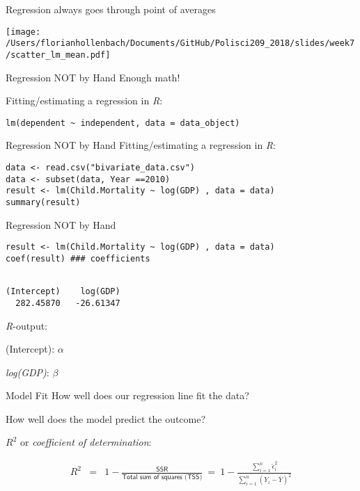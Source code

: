 \documentclass[presentation]{beamer}
\begin{document}
\begin{frame}[label={sec:orgdab9fa3}]{Regression always goes through point of averages}
\begin{center}
\texttt{[image: /Users/florianhollenbach/Documents/GitHub/Polisci209\_2018/slides/week7/scatter\_lm\_mean.pdf]}
\end{center}
\end{frame}


\begin{frame}[fragile,label={sec:org4e9f428}]{Regression NOT by Hand}
 \alert{Enough math!}

Fitting/estimating a regression in \emph{R}:

\begin{verbatim}
lm(dependent ~ independent, data = data_object)
\end{verbatim}
\end{frame}


\begin{frame}[fragile,label={sec:org700a1ad}]{Regression NOT by Hand}
 \alert{Fitting/estimating a regression in \emph{R}:}

\begin{verbatim}
data <- read.csv("bivariate_data.csv")
data <- subset(data, Year ==2010)
result <- lm(Child.Mortality ~ log(GDP) , data = data)
summary(result)
\end{verbatim}
\end{frame}


\begin{frame}[fragile,label={sec:org93b4a79}]{Regression NOT by Hand}
 \begin{verbatim}
result <- lm(Child.Mortality ~ log(GDP) , data = data)
coef(result) ### coefficients
\end{verbatim}

\begin{verbatim}

(Intercept)    log(GDP) 
  282.45870   -26.61347
\end{verbatim}

\emph{R}-output:

(Intercept): \(\alpha\)

\emph{log(GDP)}: \(\beta\)
\end{frame}

\begin{frame}[label={sec:org8d84d55}]{Model Fit}
How well does our regression line fit the data?

How well does the model predict the outcome?

\pause

\(R^{2}\) or \emph{coefficient of determination}:

\begin{eqnarray*}
      R^2 & = & 1 - \frac{\textsf{SSR}}{\textsf{Total sum of squares (TSS)}}  \ = \ 1 - \frac{\sum_{i=1}^n \hat\epsilon_i^2}{\sum_{i=1}^n (Y_i - \overline{Y})^2}
    \end{eqnarray*}
\end{frame}
\end{document}
